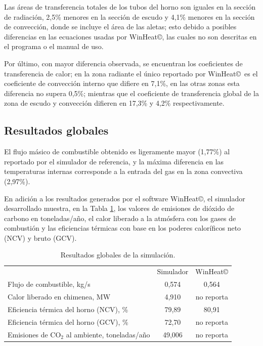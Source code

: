 \par Las áreas de transferencia totales de los tubos del horno son iguales en la sección de radiación, 2,5\% menores en la sección de escudo y 4,1\% menores en la sección de convección, donde se incluye el área de las aletas; esto debido a posibles diferencias en las ecuaciones usadas por WinHeat\copyright, las cuales no son descritas en el programa o el manual de uso.
\par Por último, con mayor diferencia observada, se encuentran los coeficientes de transferencia de calor; en la zona radiante el único reportado por WinHeat\copyright \ es el coeficiente de convección interno que difiere en 7,1\%, en las otras zonas esta diferencia no supera 0,5\%; mientras que el coeficiente de transferencia global de la zona de escudo y convección difieren en 17,3\% y 4,2\% respectivamente.

\subsection{Resultados globales}
\par El flujo másico de combustible obtenido es ligeramente mayor (1,77\%) al reportado por el simulador de referencia, y la máxima diferencia en las temperaturas internas corresponde a la entrada del gas en la zona convectiva (2,97\%).
\par En adición a los resultados generados por el software WinHeat©, el simulador desarrollado muestra, en la Tabla \ref{tbl:compara-global}, los valores de emisiones de dióxido de carbono en toneladas/año, el calor liberado a la atmósfera con los gases de combustión y las eficiencias térmicas con base en los poderes caloríficos neto (NCV) y bruto (GCV)\cite{bib:api560}.
\begin{table}[H]\begin{center}
\caption[Resultados globales de la simulación]{Resultados globales de la simulación.}
\label{tbl:compara-global} \begin{tabular}{l|c|c}
	& Simulador & WinHeat\copyright \\
Flujo de combustible, kg/s		            & 0,574 & 0,564	\\
Calor liberado en chimenea, MW	    & 4,910 & no reporta \\
Eficiencia térmica del horno (NCV), \%	& 79,89  & 80,91 \\
Eficiencia térmica del horno (GCV), \%	& 72,70  & no reporta \\
Emisiones de CO$_2$ al ambiente, toneladas/año	& 49,006  & no reporta \\
\end{tabular} \end{center} \end{table}

